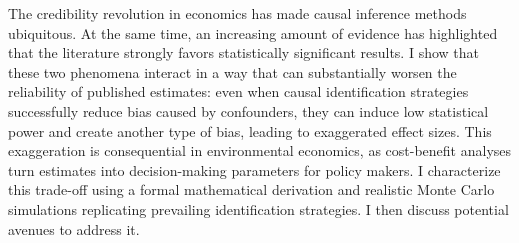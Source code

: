 The credibility revolution in economics has made causal inference methods ubiquitous. At the same time, an increasing amount of evidence has highlighted that the literature strongly favors statistically significant results. I show that these two phenomena interact in a way that can substantially worsen the reliability of published estimates: even when causal identification strategies successfully reduce bias caused by confounders, they can induce low statistical power and create another type of bias, leading to exaggerated effect sizes. This exaggeration is consequential in environmental economics, as cost-benefit analyses turn estimates into decision-making parameters for policy makers. I characterize this trade-off using a formal mathematical derivation and realistic Monte Carlo simulations replicating prevailing identification strategies. I then discuss potential avenues to address it. 

		
		
		
		
		
